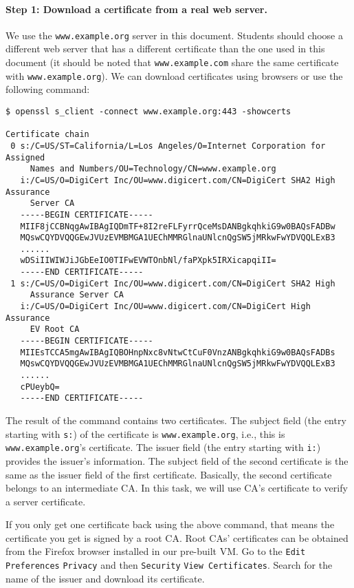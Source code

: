 \paragraph{Step 1: Download a certificate from a real web server.} 
We use the \texttt{www.example.org} server in this document. Students 
should choose a different web server that has a different certificate than the one used in this
document (it should be noted that \texttt{www.example.com} share the same certificate with
\texttt{www.example.org}). 
We can download certificates using browsers or use the following command: 

\begin{lstlisting}
$ openssl s_client -connect www.example.org:443 -showcerts

Certificate chain
 0 s:/C=US/ST=California/L=Los Angeles/O=Internet Corporation for Assigned 
     Names and Numbers/OU=Technology/CN=www.example.org
   i:/C=US/O=DigiCert Inc/OU=www.digicert.com/CN=DigiCert SHA2 High Assurance 
     Server CA
   -----BEGIN CERTIFICATE-----
   MIIF8jCCBNqgAwIBAgIQDmTF+8I2reFLFyrrQceMsDANBgkqhkiG9w0BAQsFADBw
   MQswCQYDVQQGEwJVUzEVMBMGA1UEChMMRGlnaUNlcnQgSW5jMRkwFwYDVQQLExB3
   ......
   wDSiIIWIWJiJGbEeIO0TIFwEVWTOnbNl/faPXpk5IRXicapqiII=
   -----END CERTIFICATE-----
 1 s:/C=US/O=DigiCert Inc/OU=www.digicert.com/CN=DigiCert SHA2 High 
     Assurance Server CA
   i:/C=US/O=DigiCert Inc/OU=www.digicert.com/CN=DigiCert High Assurance 
     EV Root CA
   -----BEGIN CERTIFICATE-----
   MIIEsTCCA5mgAwIBAgIQBOHnpNxc8vNtwCtCuF0VnzANBgkqhkiG9w0BAQsFADBs
   MQswCQYDVQQGEwJVUzEVMBMGA1UEChMMRGlnaUNlcnQgSW5jMRkwFwYDVQQLExB3
   ...... 
   cPUeybQ=
   -----END CERTIFICATE-----
\end{lstlisting}

The result of the command contains two certificates. The subject field (the entry starting with
\texttt{s:})  of the certificate is \texttt{www.example.org}, i.e.,
this is \texttt{www.example.org}'s certificate. The issuer field (the entry starting with 
\texttt{i:}) provides the issuer's information. The subject field of the second certificate 
is the same as the issuer field of the first certificate. Basically, the second certificate 
belongs to an intermediate CA. In this task, we will use CA's certificate to 
verify a server certificate.  

If you only get one certificate back using the above command, that means the certificate you
get is signed by a root CA. Root CAs' certificates can be obtained from the Firefox browser
installed in our pre-built VM.  Go to the \texttt{Edit}  \texttt{Preferences}
 \texttt{Privacy}  and then \texttt{Security}  \texttt{View Certificates}. 
Search for the name of the issuer and download its certificate.

